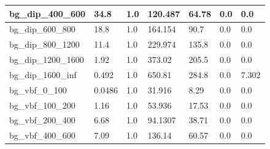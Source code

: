 \documentclass[a4paper, 10pt]{article}
\begin{document}
\begin{table}[H]
\begin{center}
\begin{tabular}{|m{23.0mm}|m{23.0mm}|m{18.0mm}|m{19.0mm}|m{19.0mm}|m{19.0mm}|m{19.0mm}|}
      \hline
      {\cellcolor{white}         bg\_dip\_400\_600}& {\cellcolor{white}         34.8}& {\cellcolor{white}         1.0}& {\cellcolor{white}         120.487}& {\cellcolor{white}         64.78}& {\cellcolor{green}         0.0}& {\cellcolor{green}         0.0}\\
      \hline
      {\cellcolor{white}         bg\_dip\_600\_800}& {\cellcolor{white}         18.8}& {\cellcolor{white}         1.0}& {\cellcolor{white}         164.154}& {\cellcolor{white}         90.7}& {\cellcolor{green}         0.0}& {\cellcolor{green}         0.0}\\
      \hline
      {\cellcolor{white}         bg\_dip\_800\_1200}& {\cellcolor{white}         11.4}& {\cellcolor{white}         1.0}& {\cellcolor{white}         229.974}& {\cellcolor{white}         135.8}& {\cellcolor{green}         0.0}& {\cellcolor{green}         0.0}\\
      \hline
      {\cellcolor{white}         bg\_dip\_1200\_1600}& {\cellcolor{white}         1.92}& {\cellcolor{white}         1.0}& {\cellcolor{white}         373.02}& {\cellcolor{white}         205.5}& {\cellcolor{green}         0.0}& {\cellcolor{green}         0.0}\\
      \hline
      {\cellcolor{white}         bg\_dip\_1600\_inf}& {\cellcolor{white}         0.492}& {\cellcolor{white}         1.0}& {\cellcolor{white}         650.81}& {\cellcolor{white}         284.8}& {\cellcolor{orange}         0.0}& {\cellcolor{orange}         7.302}\\
      \hline
      {\cellcolor{white}         bg\_vbf\_0\_100}& {\cellcolor{white}         0.0486}& {\cellcolor{white}         1.0}& {\cellcolor{white}         31.916}& {\cellcolor{white}         8.29}& {\cellcolor{green}         0.0}& {\cellcolor{green}         0.0}\\
      \hline
      {\cellcolor{white}         bg\_vbf\_100\_200}& {\cellcolor{white}         1.16}& {\cellcolor{white}         1.0}& {\cellcolor{white}         53.936}& {\cellcolor{white}         17.53}& {\cellcolor{green}         0.0}& {\cellcolor{green}         0.0}\\
      \hline
      {\cellcolor{white}         bg\_vbf\_200\_400}& {\cellcolor{white}         6.68}& {\cellcolor{white}         1.0}& {\cellcolor{white}         94.1307}& {\cellcolor{white}         38.71}& {\cellcolor{green}         0.0}& {\cellcolor{green}         0.0}\\
      \hline
      {\cellcolor{white}         bg\_vbf\_400\_600}& {\cellcolor{white}         7.09}& {\cellcolor{white}         1.0}& {\cellcolor{white}         136.14}& {\cellcolor{white}         60.57}& {\cellcolor{green}         0.0}& {\cellcolor{green}         0.0}\\

\end{tabular}
\end{center}
\end{table}
\end{document}
